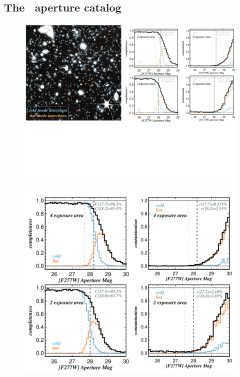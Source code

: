 \documentclass[longauth]{aa}
\begin{document}
\subsection{The \hotcold\ aperture catalog}  \label{sec:hotcold-catalog}

\begin{figure}[t!]
\includegraphics[width=0.92\columnwidth]{figures/hotcold_legend.pdf}
\includegraphics[width=1.08\columnwidth]{figures/compcont_exposures.pdf}

\end{figure}
\end{document}
